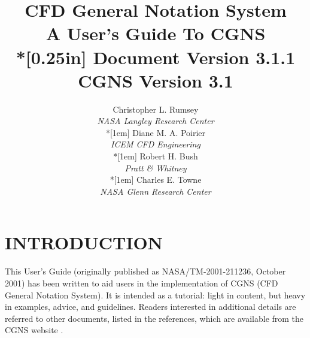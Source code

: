 \documentclass[12pt]{article}
\begin{document}
\posttitle{\par\end{flushleft}\vskip 0.5in}
\preauthor{\begin{flushleft}}
\postauthor{\par\end{flushleft}}
\title{{\bfseries CFD General Notation System\\
A User's Guide To CGNS}\\*[0.25in]
{\Large Document Version 3.1.1\\
CGNS Version 3.1}}
\author{Christopher L. Rumsey\\
\textit{NASA Langley Research Center}\\*[1em]
Diane M. A. Poirier\\
\textit{ICEM CFD Engineering}\\*[1em]
Robert H. Bush\\
\textit{Pratt \& Whitney}\\*[1em]
Charles E. Towne\\
\textit{NASA Glenn Research Center}}
\date{}
\maketitle
\thispagestyle{empty}

%
\newpage
\thispagestyle{empty}
\tableofcontents

\newpage
\renewcommand{\thepage}{\arabic{page}}
\section{INTRODUCTION}

This User's Guide (originally published as NASA/TM-2001-211236, October
2001) has been written to aid users in the implementation of CGNS (CFD
General Notation System).
It is intended as a tutorial: light in content, but
heavy in examples, advice, and guidelines.  Readers interested in
additional details are referred to other documents, listed in the references,
which are available from the CGNS website .
\end{document}
